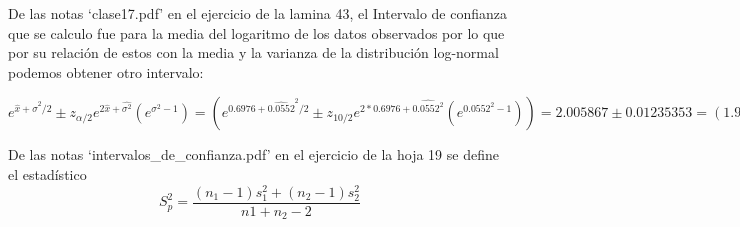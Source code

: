 \documentclass[letter]{memoir} %
\newenvironment{cframe}[1][blue]
  {\begin{tcolorbox}[colframe=#1,colback=white]}
  {\end{tcolorbox}}
\begin{document}
\begin{enumerate}
\begin{cframe}[teal]
\item  De las notas ‘clase17.pdf’ en el ejercicio de la lamina 43, el Intervalo de confianza que se calculo fue para la media del logaritmo de los datos observados por lo que por su relación de estos con la media y la varianza de la distribución log-normal podemos obtener otro intervalo:
\end{cframe}
$e^{\hat{x} +\hat{\sigma}^2/2 } \pm z_{\alpha/2} e^{2\hat{x} +\hat{\sigma^2}}(e^{\sigma^2-1})  =(e^{0.6976 +\hat{0.0552}^2/2 } \pm z_{10/2} e^{2*0.6976 +\hat{0.0552^2}}(e^{0.0552^2-1})) =2.005867 \pm 0.01235353 = (1.993514,2.018221)  $

\begin{cframe}[violet]
\item  De las notas ‘intervalos\_de\_confianza.pdf’ en el ejercicio de la hoja 19 se define el estadístico \[S_p^2 = \frac{(n_1-1)s_1^2 +(n_2-1)s_2^2}{n1+n_2-2}\]
\end{cframe}


\end{enumerate}
\end{document}
